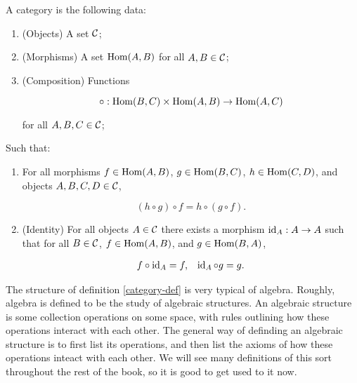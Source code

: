 \begin{defn}[Category]\label{category-def} A category is the following data:

\begin{enumerate}
\item (Objects) A set ${\mathcal C}$;
\item (Morphisms) A set $\operatorname{Hom}(A,B)$ for all $A,B\in {\mathcal C}$;
\item (Composition) Functions

$$\circ: \operatorname{Hom}(B,C)\times \operatorname{Hom}(A,B)\to \operatorname{Hom}(A,C)$$

for all $A,B,C\in {\mathcal C}$;
\end{enumerate}

Such that:

\begin{enumerate}

\item  For all morphisms $f\in \operatorname{Hom}(A,B)$, $g\in \operatorname{Hom}(B,C)$, $h\in\operatorname{Hom}(C,D)$,  and objects $A,B,C,D\in {\mathcal C}$,

$$(h\circ g)\circ f = h\circ (g\circ f).$$

\item (Identity) For all objects $A\in {\mathcal C}$ there exists a morphism $\operatorname{id}_{A}: A\to A$ such that for all $B\in {\mathcal C}$, $f\in \operatorname{Hom}(A,B)$, and $g\in \operatorname{Hom}(B,A)$,

\begin{align*}
f\circ \operatorname{id}_{A}=f, && \operatorname{id}_{A}\circ g = g.
\end{align*}

\end{enumerate}

\raggedleft\qedsymbol{}
\end{defn}

\begin{rem} The structure of definition \ref{category-def} is very typical of algebra. Roughly, algebra is defined to be the study of algebraic structures. An algebraic structure is some collection operations on some space, with rules outlining how these operations interact with each other. The general way of definding an algebraic structure is to first list its operations, and then list the axioms of how these operations inteact with each other. We will see many definitions of this sort throughout the rest of the book, so it is good to get used to it now.
\end{rem}

